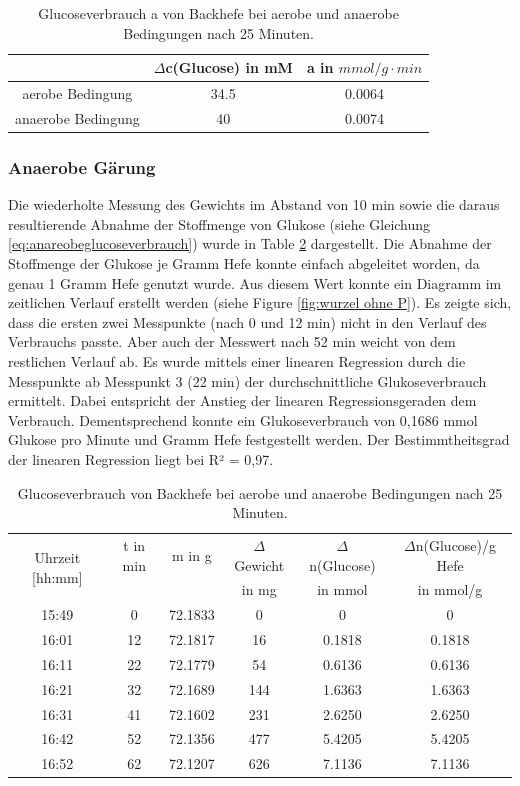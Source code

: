 \documentclass[10pt,a4paper]{article}
\begin{document}
		\begin{table}[H]
			\centering
			\caption{Glucoseverbrauch a von Backhefe bei aerobe und anaerobe Bedingungen nach 25 Minuten.}
			\label{tab:Glucoseverbrauch}
			\begin{tabular}{ccc}
				\toprule
				& $\Delta$c(Glucose) in mM& a in $mmol/ g \cdot min$\\
				\midrule
				aerobe Bedingung & 34.5 & 0.0064\\
				anaerobe Bedingung & 40 & 0.0074\\
				\bottomrule
			\end{tabular}
		\end{table}	
		
	\subsubsection{Anaerobe Gärung}
	Die wiederholte Messung des Gewichts im Abstand von 10 min sowie die daraus resultierende Abnahme der Stoffmenge von Glukose (siehe Gleichung \ref{eq:anareobeglucoseverbrauch}) wurde in Table \ref{tab:anaerobe glucoseverbrauch} dargestellt. Die Abnahme der Stoffmenge der Glukose je Gramm Hefe konnte einfach abgeleitet worden, da genau 1 Gramm Hefe genutzt wurde. Aus diesem Wert konnte ein Diagramm im zeitlichen Verlauf erstellt werden (siehe Figure \ref{fig:wurzel ohne P}). Es zeigte sich, dass die ersten zwei Messpunkte (nach 0 und 12 min) nicht in den Verlauf des Verbrauchs passte. Aber auch der Messwert nach 52 min weicht von dem restlichen Verlauf ab. Es wurde mittels einer linearen Regression durch die Messpunkte ab Messpunkt 3 (22 min) der durchschnittliche Glukoseverbrauch ermittelt. Dabei entspricht der Anstieg der linearen Regressionsgeraden dem Verbrauch. Dementsprechend konnte ein Glukoseverbrauch von 0,1686 mmol Glukose pro Minute und Gramm Hefe festgestellt werden. Der Bestimmtheitsgrad der linearen Regression liegt bei R² = 0,97.
	
	\begin{table}[H]
		\centering
		\caption{Glucoseverbrauch von Backhefe bei aerobe und anaerobe Bedingungen nach 25 Minuten.}
		\label{tab:anaerobe glucoseverbrauch}
		\begin{tabular}{cccccc}
			\toprule
			\multirow{2}{*}{Uhrzeit [hh:mm]}& t in min & m in g & $\Delta$ Gewicht & $\Delta$ n(Glucose) & $\Delta$n(Glucose)/g Hefe\\
			& && in mg & in mmol&  in mmol/g\\
			\midrule
			15:49 & 0 & 72.1833 & 0 & 0 & 0\\
			16:01 & 12 & 72.1817 & 16 & 0.1818 & 0.1818\\
			16:11 & 22 & 72.1779 & 54 & 0.6136 & 0.6136\\
			16:21 & 32 & 72.1689 & 144 & 1.6363 & 1.6363\\
			16:31 & 41 & 72.1602 & 231 & 2.6250 & 2.6250\\
			16:42 & 52 &72.1356 & 477 & 5.4205 & 5.4205\\
			16:52 & 62 & 72.1207 & 626 & 7.1136 & 7.1136\\
			\bottomrule
		\end{tabular}
	\end{table}	
	
\end{document}
